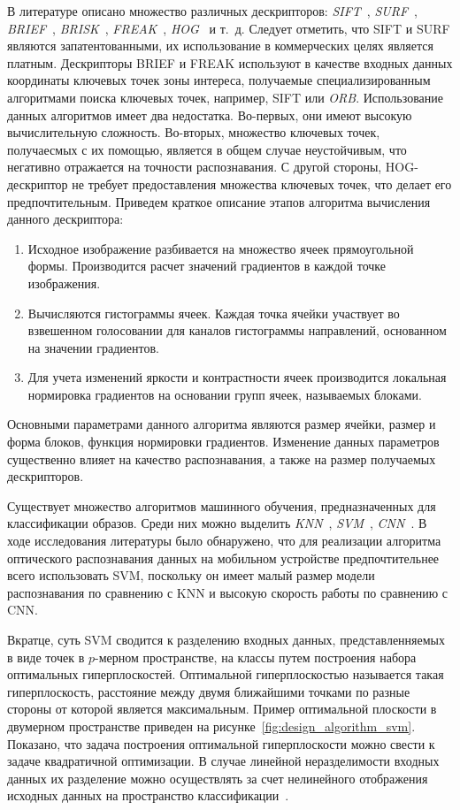 В литературе описано множество различных дескрипторов:
\textit{SIFT}~\cite{lowe04},
\textit{SURF}~\cite{bay08},
\textit{BRIEF}~\cite{calonder10},
\textit{BRISK}~\cite{leutenegger11},
\textit{FREAK}~\cite{ortiz12},
\textit{HOG}~\cite{dalal05} и т.~д.
Следует отметить, что SIFT и SURF являются запатентованными,
их использование в коммерческих целях является платным.
Дескрипторы BRIEF и FREAK используют в качестве входных данных координаты
ключевых точек зоны интереса, получаемые специализированным алгоритмами
поиска ключевых точек, например, SIFT или \textit{ORB}.
Использование данных алгоритмов имеет два недостатка.
Во-первых, они имеют высокую вычислительную сложность.
Во-вторых, множество ключевых точек, получаесмых с их помощью,
является в общем случае неустойчивым, что негативно отражается
на точности распознавания.
С другой стороны, HOG-дескриптор не требует предоставления множества
ключевых точек, что делает его предпочтительным.
Приведем краткое описание этапов алгоритма вычисления данного дескриптора:
\begin{enumerate}
\item Исходное изображение разбивается на множество ячеек прямоугольной формы.
  Производится расчет значений градиентов в каждой точке изображения.
\item Вычисляются гистограммы ячеек. Каждая точка ячейки участвует
  во взвешенном голосовании для каналов гистограммы направлений, основанном
  на значении градиентов.
\item Для учета изменений яркости и контрастности ячеек производится локальная
  нормировка градиентов на основании групп ячеек, называемых блоками.
\end{enumerate}

Основными параметрами данного алгоритма являются размер ячейки,
размер и форма блоков, функция нормировки градиентов. Изменение
данных параметров существенно влияет на качество распознавания,
а также на размер получаемых дескрипторов.

Существует множество алгоритмов машинного обучения,
предназначенных для классификации образов.
Среди них можно выделить
\textit{KNN}~\cite{cover67}, \textit{SVM}~\cite{vapnik74}, \textit{CNN}~\cite{lecun98}.
В ходе исследования литературы было обнаружено, что
для реализации алгоритма оптического распознавания данных
на мобильном устройстве предпочтительнее всего использовать SVM,
поскольку он имеет малый размер модели распознавания по сравнению с KNN
и высокую скорость работы по сравнению с CNN.

Вкратце, суть SVM сводится к разделению входных данных,
представленняемых в виде точек в \( p \)-мерном пространстве,
на классы путем построения набора оптимальных гиперплоскостей.
Оптимальной гиперплоскостью называется такая гиперплоскость,
расстояние между двумя ближайшими точками по разные стороны от которой
является максимальным.
Пример оптимальной плоскости в двумерном пространстве приведен
на рисунке~\ref{fig:design_algorithm_svm}.
Показано, что задача построения оптимальной гиперплоскости можно свести
к задаче квадратичной оптимизации.
В случае линейной неразделимости входных данных их разделение
можно осуществлять за счет нелинейного отображения исходных данных
на пространство классификации~\cite{boser92}.

